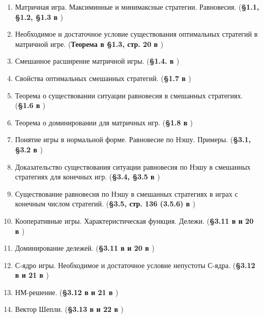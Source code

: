 \documentclass[a4paper,14pt]{extarticle}
\begin{document}


\newpage
\tableofcontents


\begin{enumerate}
    \item Матричная игра. Максиминные и минимаксные стратегии. Равновесия.
        (\textbf{\S 1.1, \S 1.2, \S 1.3 в \cite{gametheory-2012}})
    \item Необходимое и достаточное условие существования оптимальных стратегий в матричной игре.
        (\textbf{Теорема в \S 1.3, стр. 20 в \cite{gametheory-2012}})
    \item Смешанное расширение матричной игры.
        (\textbf{\S 1.4. в \cite{gametheory-2012}})
    \item Свойства оптимальных смешанных стратегий.
        (\textbf{\S 1.7 в \cite{gametheory-2012}})
    \item Теорема о существовании ситуации равновесия в смешанных стратегиях.
        (\textbf{\S 1.6 в \cite{gametheory-2012}})
    \item Теорема о доминировании для матричных игр.
        (\textbf{\S 1.8 в \cite{gametheory-2012}})
    \item Понятие игры в нормальной форме. Равновесие по Нэшу. Примеры.
        (\textbf{\S 3.1, \S 3.2 в \cite{gametheory-2012}})
    \item Доказательство существования ситуации равновесия по Нэшу в смешанных стратегиях для конечных игр.
        (\textbf{\S 3.4, \S 3.5 в \cite{gametheory-2012}})
    \item Существование равновесия по Нэшу в смешанных стратегиях в играх с конечным числом стратегий.
        (\textbf{\S 3.5, стр. 136 (3.5.6) в \cite{gametheory-2012}})
    \item Кооперативные игры. Характеристическая функция. Дележи.
        (\textbf{\S 3.11 в \cite{gametheory-2012} и 20 в \cite{sharshukov-xyz}})
    \item Доминирование дележей.
        (\textbf{\S 3.11 в \cite{gametheory-2012} и 20 в \cite{sharshukov-xyz}})
    \item С-ядро игры. Необходимое и достаточное условие непустоты С-ядра.
        (\textbf{\S 3.12 в \cite{gametheory-2012} и 21 в \cite{sharshukov-xyz}})
    \item НМ-решение.
        (\textbf{\S 3.12 в \cite{gametheory-2012} и 21 в \cite{sharshukov-xyz}})
    \item Вектор Шепли.
        (\textbf{\S 3.13 в \cite{gametheory-2012} и 22 в \cite{sharshukov-xyz}})

\end{enumerate}
\end{document}
